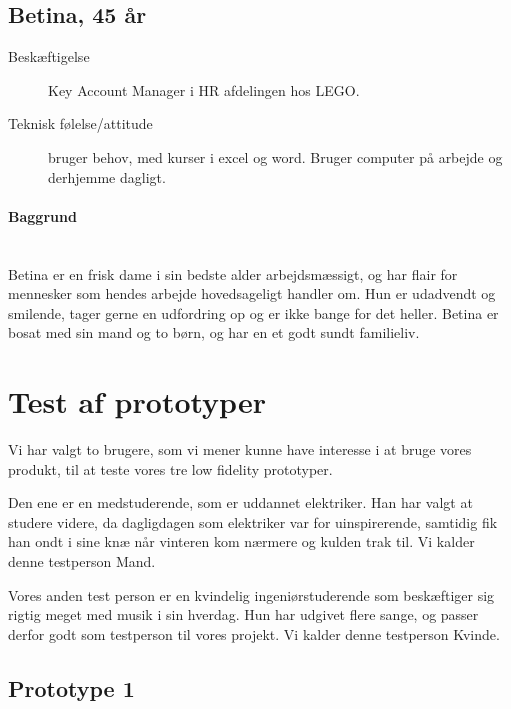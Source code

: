 \documentclass[a4paper,titlepage,fleqn,12pt]{article}
\begin{document}
\subsection{Betina, 45 år}
\begin{description}
	\item[Beskæftigelse] Key Account Manager i HR afdelingen hos LEGO. \item[Teknisk følelse/attitude] bruger behov, med kurser i excel og word. Bruger computer på arbejde og derhjemme dagligt.
\end{description}
\paragraph{Baggrund}\hfill\\
Betina er en frisk dame i sin bedste alder arbejdsmæssigt, og har flair for mennesker som hendes arbejde hovedsageligt handler om. Hun er udadvendt og smilende, tager gerne en udfordring op og er ikke bange for det heller. Betina er bosat med sin mand og to børn, og har en et godt sundt familieliv.

\section{Test af prototyper}

Vi har valgt to brugere, som vi mener kunne have interesse i at bruge vores produkt, til at teste vores tre low fidelity prototyper. 

Den ene er en medstuderende, som er uddannet elektriker. Han har valgt at studere videre, da dagligdagen som elektriker var for uinspirerende, samtidig fik han ondt i sine knæ når vinteren kom nærmere og kulden trak til. Vi kalder denne testperson Mand.

Vores anden test person er en kvindelig ingeniørstuderende som beskæftiger sig rigtig meget med musik i sin hverdag. Hun har udgivet flere sange, og passer derfor godt som testperson til vores projekt. Vi kalder denne testperson Kvinde.


\subsection{Prototype 1}
\end{document}

